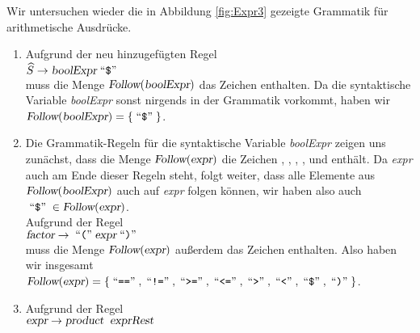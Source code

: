 \example
Wir untersuchen wieder die in Abbildung \ref{fig:Expr3} gezeigte Grammatik f\"ur arithmetische Ausdr\"ucke.
\begin{enumerate}
\item Aufgrund der neu hinzugef\"ugten Regel
      \\[0.2cm]
      \hspace*{1.3cm}
      $\widehat{S} \rightarrow \textsl{boolExpr} \quoted{\symbol{36}}$
      \\[0.2cm]
      muss die Menge $\textsl{Follow}(\textsl{boolExpr})$ das Zeichen 
      enthalten.  Da die syntaktische Variable \textsl{boolExpr} sonst nirgends in der
      Grammatik vorkommt, haben wir 
      \\[0.2cm]
      \hspace*{1.3cm}
      $\textsl{Follow}(\textsl{boolExpr}) = \{ \quoted{\symbol{36}} \}$.
\item Die Grammatik-Regeln f\"ur die syntaktische Variable \textsl{boolExpr}
      zeigen uns zun\"achst, dass die Menge $\textsl{Follow}(\textsl{expr})$ die Zeichen
      \qote{==}, \qote{!=}, \qote{<=}, \qote{>=}, \qote{<}   und \qote{>} enth\"alt.  Da \textsl{expr} auch am Ende dieser Regeln steht,
      folgt weiter, dass alle Elemente aus $\textsl{Follow}(\textsl{boolExpr})$ auch auf 
      \textsl{expr} folgen k\"onnen, wir haben also auch
      \\[0.2cm]
      \hspace*{1.3cm}
      $\quoted{\symbol{36}} \in \textsl{Follow}(\textsl{expr})$.
      \\[0.2cm]
      Aufgrund der Regel 
      \\[0.2cm]
      \hspace*{1.3cm}
      $\textsl{factor} \rightarrow \;\mbox{``\texttt{(}''}\; \textsl{expr} \;\mbox{``\texttt{)}''}\;$
      \\[0.2cm]
      muss die Menge $\textsl{Follow}(\textsl{expr})$ au{\ss}erdem das Zeichen \qote{)}
      enthalten.  Also haben wir insgesamt
      \\[0.2cm]
      \hspace*{1.3cm}
      $\textsl{Follow}(\textsl{expr}) = \{ \quoted{==}, \quoted{!=}, \quoted{>=}, \quoted{<=}, \quoted{>}, \quoted{<}, \quoted{\symbol{36}}, \quoted{)} \}$.
\item Aufgrund der Regel 
      \\[0.2cm]
      \hspace*{1.3cm}
      $\textsl{expr} \rightarrow \textsl{product}\;\;\textsl{exprRest}$
      \\[0.2cm]      

\end{enumerate}
